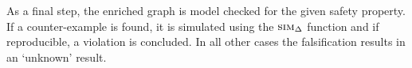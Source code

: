 
As a final step, the enriched graph is model checked for the given
safety property. If a counter-example is found, it is simulated using
the $\mbox{\sc sim}_\Delta$ function and if reproducible, a violation is
concluded. In all other cases the falsification results in an
`unknown' result.











